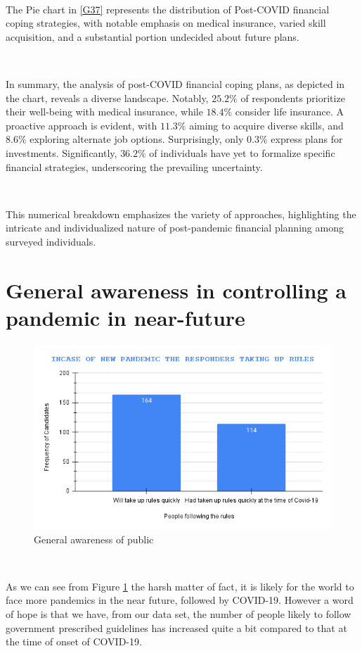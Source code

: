 \ 

The Pie chart in \ref{G37} represents the distribution of Post-COVID financial coping strategies, with notable emphasis on medical insurance, varied skill acquisition, and a substantial portion undecided about future plans.

\

In summary, the analysis of post-COVID financial coping plans, as depicted in the chart, reveals a diverse landscape. Notably, $25.2\%$ of respondents prioritize their well-being with medical insurance, while $18.4\%$ consider life insurance. A proactive approach is evident, with $11.3\%$ aiming to acquire diverse skills, and $8.6\%$ exploring alternate job options. Surprisingly, only $0.3\%$ express plans for investments. Significantly, $36.2\%$ of individuals have yet to formalize specific financial strategies, underscoring the prevailing uncertainty. 

\

This numerical breakdown emphasizes the variety of approaches, highlighting the intricate and individualized nature of post-pandemic financial planning among surveyed individuals.

\section{General awareness in controlling a pandemic in near-future}

\begin{figure}[h!]
	\centering
	\includegraphics[width=0.9\linewidth]{IMAGES/Image 38.png}
	\caption{General awareness of public}
	\label{G38}
\end{figure}

\ 

As we can see from Figure \ref{G38} the harsh matter of fact, it is likely for the world to face more pandemics in the near future, followed by COVID-19. However a word of hope is that we have, from our data set, the number of people likely to follow government prescribed guidelines has increased quite a bit compared to that at the time of onset of COVID-19.

